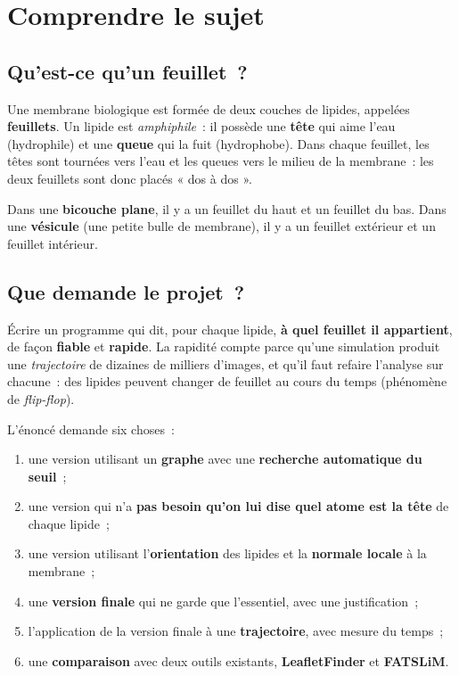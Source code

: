 \documentclass[11pt,a4paper]{article}
\begin{document}
\section{Comprendre le sujet}
\subsection{Qu'est-ce qu'un feuillet~?}
Une membrane biologique est formée de deux couches de lipides, appelées \textbf{feuillets}. Un lipide est
\emph{amphiphile}~: il possède une \textbf{tête} qui aime l'eau (hydrophile) et une \textbf{queue} qui la fuit
(hydrophobe). Dans chaque feuillet, les têtes sont tournées vers l'eau et les queues vers le milieu de la
membrane~: les deux feuillets sont donc placés « dos à dos ».

Dans une \textbf{bicouche plane}, il y a un feuillet du haut et un feuillet du bas. Dans une
\textbf{vésicule} (une petite bulle de membrane), il y a un feuillet extérieur et un feuillet intérieur.

\subsection{Que demande le projet~?}
Écrire un programme qui dit, pour chaque lipide, \textbf{à quel feuillet il appartient}, de façon
\textbf{fiable} et \textbf{rapide}. La rapidité compte parce qu'une simulation produit une
\emph{trajectoire} de dizaines de milliers d'images, et qu'il faut refaire l'analyse sur chacune~: des lipides
peuvent changer de feuillet au cours du temps (phénomène de \emph{flip-flop}).

L'énoncé demande six choses~:
\begin{enumerate}
\item une version utilisant un \textbf{graphe} avec une \textbf{recherche automatique du seuil}~;
\item une version qui n'a \textbf{pas besoin qu'on lui dise quel atome est la tête} de chaque lipide~;
\item une version utilisant l'\textbf{orientation} des lipides et la \textbf{normale locale} à la membrane~;
\item une \textbf{version finale} qui ne garde que l'essentiel, avec une justification~;
\item l'application de la version finale à une \textbf{trajectoire}, avec mesure du temps~;
\item une \textbf{comparaison} avec deux outils existants, \textbf{LeafletFinder} et \textbf{FATSLiM}.
\end{enumerate}
\end{document}
